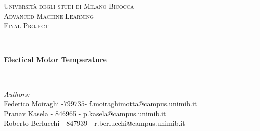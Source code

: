 \begin{titlepage}

\newcommand{\HRule}{\rule{\linewidth}{0.5mm}} %

\center %
 

\textsc{\LARGE Università degli studi di Milano-Bicocca}\\[1cm] %
\textsc{\Large Advanced Machine Learning }\\[0.3cm] %
\textsc{\large Final Project}\\[0.1cm] %


\HRule \\[0.4cm]
{ \huge \bfseries Electical Motor Temperature}\\[0.2cm] %
\HRule \\[1.5cm]
 

\large
\emph{Authors:}\\
Federico Moiraghi -$799735$- f.moiraghimotta@campus.unimib.it \\
Pranav Kasela - 846965 - p.kasela@campus.unimib.it \\
Roberto Berlucchi - 847939 - r.berlucchi@campus.unimib.it \\
[0.5cm] %




\end{titlepage}
